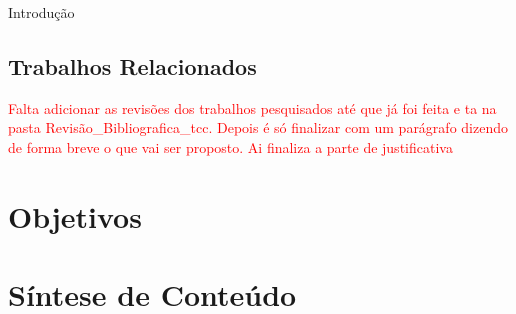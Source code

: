 \begin{chapter}{Introdução}
\subsection{Trabalhos Relacionados}

\textcolor{red}{Falta adicionar as revisões dos trabalhos pesquisados até que já foi feita e ta
na pasta Revisão\_Bibliografica\_tcc. Depois é só finalizar com um parágrafo
dizendo de forma breve o que vai ser proposto. Ai finaliza a parte de
justificativa}
\section{Objetivos}

\section{Síntese de Conteúdo}


\end{chapter}
